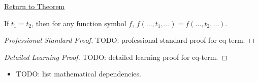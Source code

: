 \newpage
{}
\label{prf:eq-term}

\begin{remark*}[Return]
\hyperref[thm:eq-term]{Return to Theorem}
\end{remark*}

\begin{theorem*}
If $t_1 = t_2$, then for any function symbol $f$,
$f(\dots,t_1,\dots) = f(\dots,t_2,\dots)$.
\end{theorem*}

\begin{proof}[Professional Standard Proof]
\LRAProofBodyStart
TODO: professional standard proof for eq-term.
\end{proof}

\begin{proof}[Detailed Learning Proof]
\LRAProofBodyStart
TODO: detailed learning proof for eq-term.
\end{proof}

\begin{remark*}
\end{remark*}

\begin{dependencies}
\begin{itemize}
  \item TODO: list mathematical dependencies.
\end{itemize}
\end{dependencies}

\clearpage
